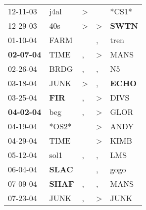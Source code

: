 \begin{supertabular}{p{0.07\textwidth}p{0.06\textwidth}p{0.02\textwidth}p{0.02\textwidth}p{0.06\textwidth}}
          12-11-03\textsuperscript{} &           j4al\textsuperscript{} &     \textgreater &                  &                            *CS1* \\
          12-29-03\textsuperscript{} &            40s\textsuperscript{} &     \textgreater &     \textgreater &  \textbf{SWTN\textsuperscript{}} \\
          01-10-04\textsuperscript{} &           FARM\textsuperscript{} &                  &                , &           tren\textsuperscript{} \\
 \textbf{02-07-04\textsuperscript{}} &           TIME\textsuperscript{} &                , &     \textgreater &           MANS\textsuperscript{} \\
          02-26-04\textsuperscript{} &           BRDG\textsuperscript{} &                , &                , &             N5\textsuperscript{} \\
          03-18-04\textsuperscript{} &           JUNK\textsuperscript{} &     \textgreater &                , &  \textbf{ECHO\textsuperscript{}} \\
          03-25-04\textsuperscript{} &   \textbf{FIR\textsuperscript{}} &                , &     \textgreater &           DIVS\textsuperscript{} \\
 \textbf{04-02-04\textsuperscript{}} &            beg\textsuperscript{} &                , &     \textgreater &           GLOR\textsuperscript{} \\
          04-19-04\textsuperscript{} &                            *OS2* &                  &     \textgreater &           ANDY\textsuperscript{} \\
          04-29-04\textsuperscript{} &           TIME\textsuperscript{} &                  &     \textgreater &           KIMB\textsuperscript{} \\
          05-12-04\textsuperscript{} &           sol1\textsuperscript{} &                , &                , &            LMS\textsuperscript{} \\
          06-04-04\textsuperscript{} &  \textbf{SLAC\textsuperscript{}} &                  &                , &           gogo\textsuperscript{} \\
          07-09-04\textsuperscript{} &  \textbf{SHAF\textsuperscript{}} &                , &                , &           MANS\textsuperscript{} \\
          07-23-04\textsuperscript{} &           JUNK\textsuperscript{} &                , &     \textgreater &           JUNK\textsuperscript{} \\

\end{supertabular}
